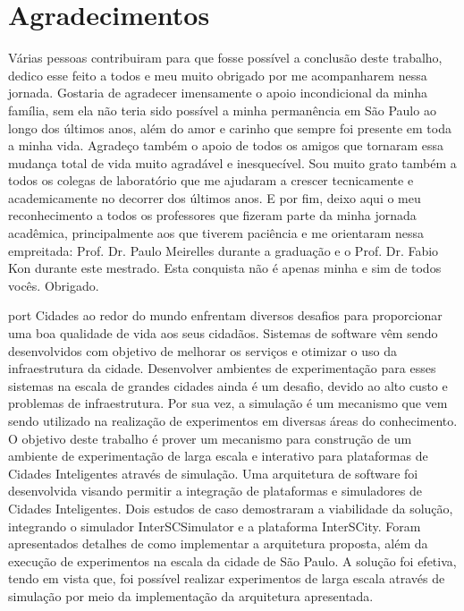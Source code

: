 \chapter*{Agradecimentos}

Várias pessoas contribuiram para que fosse possível a conclusão deste trabalho, dedico esse feito a todos e meu muito obrigado por me acompanharem nessa jornada.
Gostaria de agradecer imensamente o apoio incondicional da minha família, sem ela não teria sido possível a minha permanência em São Paulo ao longo dos últimos anos, além do amor e carinho que sempre foi
presente em toda a minha vida.
Agradeço também o apoio de todos os amigos que tornaram essa mudança total de vida muito agradável e inesquecível.
Sou muito grato também a todos os colegas de laboratório que me ajudaram a crescer tecnicamente e academicamente no decorrer dos últimos anos.
E por fim, deixo aqui o meu reconhecimento a todos os professores que fizeram parte da minha jornada acadêmica, principalmente aos que tiverem paciência e me orientaram nessa empreitada: Prof. Dr. Paulo 
Meirelles durante a graduação e o Prof. Dr. Fabio Kon durante este mestrado.
Esta conquista não é apenas minha e sim de todos vocês.
Obrigado.

\begin{resumo}{port}
Cidades ao redor do mundo enfrentam diversos desafios para proporcionar uma boa qualidade de vida aos seus cidadãos.
Sistemas de software vêm sendo desenvolvidos com objetivo de melhorar os serviços e otimizar o uso da infraestrutura da cidade.
Desenvolver ambientes de experimentação para esses sistemas na escala de grandes cidades ainda é um desafio, devido ao alto custo e problemas de infraestrutura.
Por sua vez, a simulação é um mecanismo que vem sendo utilizado na realização de experimentos em diversas áreas do conhecimento.
O objetivo deste trabalho é prover um mecanismo para construção de um ambiente de experimentação de larga escala e interativo para plataformas de Cidades Inteligentes através de simulação.
Uma arquitetura de software foi desenvolvida visando permitir a integração de plataformas e simuladores de Cidades Inteligentes.
Dois estudos de caso demostraram a viabilidade da solução, integrando o simulador InterSCSimulator e a plataforma InterSCity.
Foram apresentados detalhes de como implementar a arquitetura proposta, além da execução de experimentos na escala da cidade de São Paulo.
A solução foi efetiva, tendo em vista que, foi possível realizar experimentos de larga escala através de simulação por meio da implementação da arquitetura apresentada.
\end{resumo}

